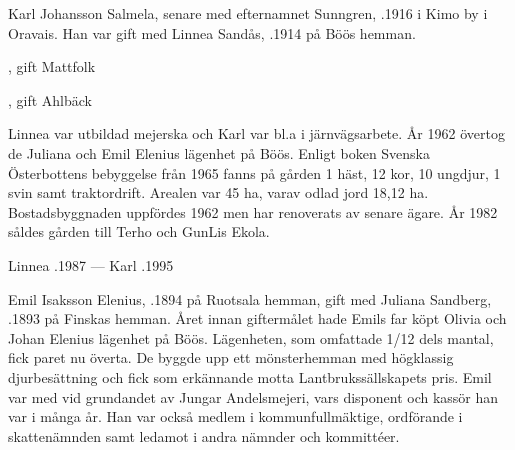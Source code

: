 Karl Johansson Salmela, senare med efternamnet Sunngren, .1916 i Kimo by i Oravais. Han var gift med Linnea Sandås, .1914 på Böös hemman.
\begin{jhchildren}
  \item {}
  \item {}
  \item {}, gift Mattfolk
  \item {}, gift Ahlbäck
  \item {}
  \item {}
\end{jhchildren}
Linnea var utbildad mejerska och Karl var bl.a i järnvägsarbete. År 1962 övertog de Juliana och Emil Elenius lägenhet på Böös. Enligt boken Svenska Österbottens bebyggelse från 1965 fanns på gården 1 häst, 12 kor, 10 ungdjur, 1 svin samt traktordrift. Arealen var 45 ha, varav odlad jord 18,12 ha. Bostadsbyggnaden uppfördes 1962 men har renoverats av senare ägare. År 1982 såldes gården till Terho och GunLis Ekola.

Linnea .1987 --- Karl .1995






Emil Isaksson Elenius, .1894 på Ruotsala hemman, gift med Juliana Sandberg, .1893 på Finskas hemman. Året innan giftermålet hade Emils far köpt Olivia och Johan Elenius lägenhet på Böös. Lägenheten, som omfattade 1/12 dels mantal, fick	paret nu överta. De byggde upp ett mönsterhemman med högklassig djurbesättning och fick som erkännande motta Lantbrukssällskapets pris. Emil var med vid grundandet av Jungar Andelsmejeri, vars disponent och kassör han var i många år. Han var också medlem i kommunfullmäktige, ordförande i skattenämnden samt ledamot i andra nämnder och kommittéer.

